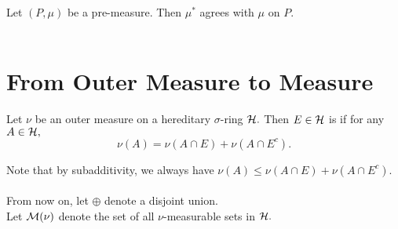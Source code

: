 \begin{prop}
Let $(P,\mu)$ be a pre-measure. Then $\mu^*$ agrees with $\mu$ on $P.$ \\ \\
\end{prop}

\section{From Outer Measure to Measure}
\begin{defn}
Let $\nu$ be an outer measure on a hereditary $\sigma$-ring $\mathcal{H}.$ Then $E\in\mathcal{H}$ is  if for any $A\in\mathcal{H},$
$$\nu(A)=\nu(A\cap E)+\nu(A\cap E^c).$$
\end{defn}

\noindent Note that by subadditivity, we always have $\nu(A)\leq\nu(A\cap E)+\nu(A\cap E^c).$ \\ \\
From now on, let $\oplus$ denote a disjoint union. \\
Let $\mathcal{M}(\nu)$ denote the set of all $\nu$-measurable sets in $\mathcal{H}.$

